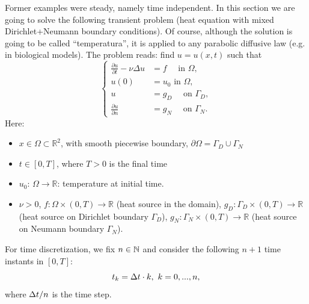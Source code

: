 \documentclass[12pt]{article}
\newcommand{\R}{{\mathbb R}}
\begin{document}
Former examples were steady, namely time independent. In this section
we are going to solve the following transient problem (heat equation
with mixed Dirichlet+Neumann boundary conditions). Of course, although
the solution is going to be called ``temperatura'', it is applied to
any parabolic diffusive law (e.g. in biological models). The problem
reads: find $u=u(x,t)$ such that
\begin{equation}
  \label{eq:heat equation}
  \left\{
    \begin{aligned}
      \frac{\partial u}{\partial t} -\nu\Delta u &= f \quad \text{ in } \Omega, \\
      u(0)&=u_0 \text{ in } \Omega, \\
      u &= g_D \quad \text{ on } \Gamma_D, \\
      \frac{\partial u}{\partial n} &= g_N \quad \text{ on } \Gamma_N.
    \end{aligned}
    \right.
\end{equation}
Here:
\begin{itemize}
\item $x\in\Omega\subset\R^2$, with smooth piecewise boundary,  $\partial\Omega=\Gamma_D\cup\Gamma_N$
\item $t\in [0,T]$, where $T>0$ is the final time
\item $u_0$: $\Omega\to\R$: temperature at initial time.
\item $\nu>0$, $f:\Omega\times(0,T)\to\R$ (heat source in the domain),
  $g_D:\Gamma_D\times(0,T)\to\R$ (heat source on Dirichlet boundary $\Gamma_D$),
  $g_N:\Gamma_N\times(0,T)\to\R$ (heat source on Neumann boundary $\Gamma_N$).
\end{itemize}

For time discretization, we fix $n\in{\mathbb N}$ and consider the
following $n+1$ time instants in $[0,T]$:
$$t_k= \Delta t\cdot k, \ k=0, ..., n,$$
where $\Delta t/n$ is the time step.
\end{document}
